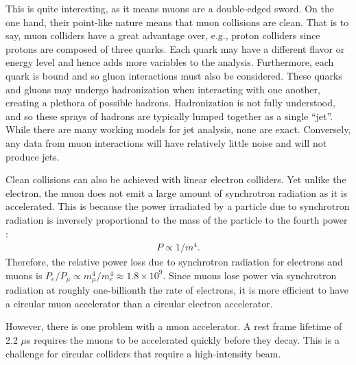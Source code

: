This is quite interesting, as it means muons are a double-edged sword. On the one hand, their point-like nature means that muon collisions are clean. That is to say, muon colliders have a great advantage over, e.g., proton colliders since protons are composed of three quarks. Each quark may have a different flavor or energy level and hence adds more variables to the analysis. Furthermore, each quark is bound and so gluon interactions must also be considered. These quarks and gluons may undergo hadronization when interacting with one another, creating a plethora of possible hadrons. Hadronization is not fully understood, and so these sprays of hadrons are typically lumped together as a single ``jet''. While there are many working models for jet analysis, none are exact. Conversely, any data from muon interactions will have relatively little noise and will not produce jets.

Clean collisions can also be achieved with linear electron colliders. Yet unlike the electron, the muon does not emit a large amount of synchrotron radiation as it is accelerated. This is because the power irradiated by a particle due to synchrotron radiation is inversely proportional to the mass of the particle to the fourth power \cite{griffithsem}:
\begin{align*}
P \propto 1/m^4.
\end{align*}
Therefore, the relative power loss due to synchrotron radiation for electrons and muons is $P_e/P_\mu\propto m_\mu ^4/m_e ^4 \approx 1.8 \times 10^9$. Since muons lose power via synchrotron radiation at roughly one-billionth the rate of electrons, it is more efficient to have a circular muon accelerator than a circular electron accelerator.

However, there is one problem with a muon accelerator. A rest frame lifetime of 2.2 $\mu$s requires the muons to be accelerated quickly before they decay. This is a challenge for circular colliders that require a high-intensity beam.

